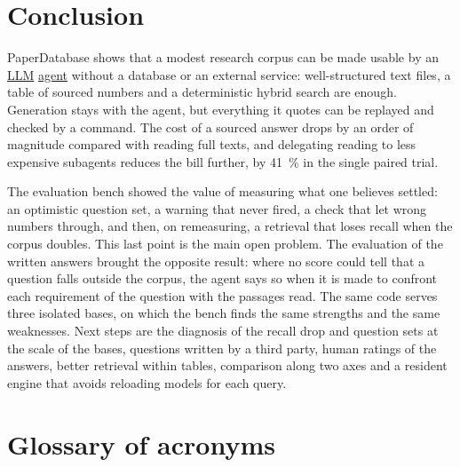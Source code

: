 \documentclass[11pt,a4paper]{article}
\newcommand{\gl}[2]{\hyperlink{gl:#1}{\textcolor{glcolor}{#2}}}
\begin{document}
\section{Conclusion}

PaperDatabase shows that a modest research corpus can be made usable by an \gl{LLM}{LLM} \gl{agent}{agent} without
a database or an external service: well-structured text files, a table of sourced numbers
and a deterministic hybrid search are enough. Generation stays with the agent, but
everything it quotes can be replayed and checked by a command. The cost of a sourced answer
drops by an order of magnitude compared with reading full texts, and delegating reading to
less expensive subagents reduces the bill further, by 41~\% in the single paired trial.

The evaluation bench showed the value of measuring what one believes settled: an optimistic
question set, a warning that never fired, a check that let wrong numbers through, and then,
on remeasuring, a retrieval that loses recall when the corpus doubles. This last point is the
main open problem. The evaluation of the written answers brought the opposite result: where no
score could tell that a question falls outside the corpus, the agent says so when it is made
to confront each requirement of the question with the passages read. The same code serves
three isolated bases, on which the bench finds the same strengths and the same weaknesses.
Next steps are the diagnosis of the recall drop and question sets at the scale of the bases,
questions written by a third party, human ratings of the answers, better retrieval within
tables, comparison along two axes and a resident engine that avoids reloading models for each
query.




\appendix
\section{Glossary of acronyms}
\label{sec:acronymes}
\end{document}
